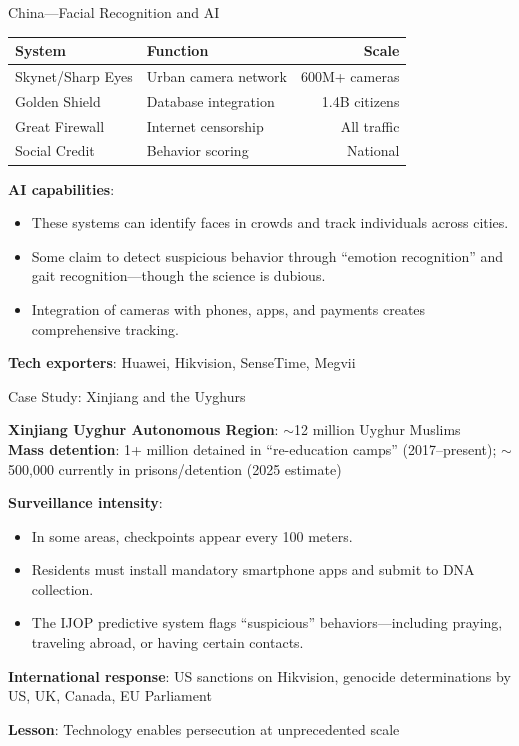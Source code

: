 ﻿\documentclass[aspectratio=169,11pt]{beamer}
\begin{document}
\begin{frame}{China---Facial Recognition and AI}
\begin{table}[h]
\centering
\scriptsize
\begin{tabular}{@{}llr@{}}
\toprule
\textbf{System} & \textbf{Function} & \textbf{Scale} \\
\midrule
Skynet/Sharp Eyes & Urban camera network & 600M+ cameras \\
Golden Shield & Database integration & 1.4B citizens \\
Great Firewall & Internet censorship & All traffic \\
Social Credit & Behavior scoring & National \\
\bottomrule
\end{tabular}
\end{table}

\vspace{0.2em}
\textbf{AI capabilities}:
\begin{itemize}
    \item These systems can identify faces in crowds and track individuals across cities.
    \item Some claim to detect suspicious behavior through ``emotion recognition'' and gait recognition---though the science is dubious.
    \item Integration of cameras with phones, apps, and payments creates comprehensive tracking.
\end{itemize}

\textbf{Tech exporters}: Huawei, Hikvision, SenseTime, Megvii
\end{frame}

\begin{frame}{Case Study: Xinjiang and the Uyghurs}
\begin{casestudybox}
\small
\textbf{Xinjiang Uyghur Autonomous Region}: $\sim$12 million Uyghur Muslims\\
\textbf{Mass detention}: 1+ million detained in ``re-education camps'' (2017--present); $\sim$500,000 currently in prisons/detention (2025 estimate)
\end{casestudybox}

\vspace{0.2em}
\textbf{Surveillance intensity}:
\begin{itemize}
    \item In some areas, checkpoints appear every 100 meters.
    \item Residents must install mandatory smartphone apps and submit to DNA collection.
    \item The IJOP predictive system flags ``suspicious'' behaviors---including praying, traveling abroad, or having certain contacts.
\end{itemize}

\textbf{International response}: US sanctions on Hikvision, genocide determinations by US, UK, Canada, EU Parliament

\textbf{Lesson}: Technology enables persecution at unprecedented scale
\end{frame}
\end{document}
